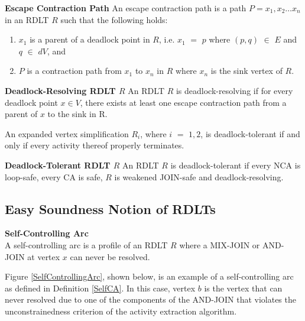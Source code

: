 \begin{defn}\textbf{Escape Contraction Path}
    \cite{Ramirez2024}
    \label{ECPath}
    An escape contraction path is a path $ P = x_1, x_2 \ldots x_n $ in an RDLT $ R $ such that the following holds:
    \begin{enumerate}
        \item $ x_1 $ is a parent of a deadlock point in $ R $, i.e. $ x_1 $ $ = $ $ p $ where $ (p,q) $ $ \in $ $ E $ and $ q $ $ \in $ $ dV $, and
        \item $ P $ is a contraction path from $ x_1 $ to $ x_n $ in $ R $ where $ x_n $ is the sink vertex of $ R $.
    \end{enumerate}
\end{defn}

\begin{defn}\textbf{Deadlock-Resolving RDLT $ R $}
    \label{DLResolving}
    \cite{Ramirez2024}
    An RDLT $ R $ is deadlock-resolving if for every deadlock point $ x \in V $, there exists at least one escape contraction path from a parent of $ x $ to the sink in R.
\end{defn}

\begin{lem}
    \cite{Ramirez2024}
    An expanded vertex simplification $ R_i $, where $ i $ $ = $ $ 1, 2 $, is deadlock-tolerant if and only if every activity thereof properly terminates.
\end{lem}

\begin{defn}\textbf{Deadlock-Tolerant RDLT $ R $}
    \cite{Ramirez2024}
    An RDLT $ R $ is deadlock-tolerant if every NCA is loop-safe, every CA is safe, $ R $ is weakened JOIN-safe and deadlock-resolving.
\end{defn}

\subsection*{Easy Soundness Notion of RDLTs}

\begin{defn}\textbf{Self-Controlling Arc} \\
    \cite{Ramirez2024}
    \label{SelfCA}
    A self-controlling arc is a profile of an RDLT $ R $ where a MIX-JOIN or AND-JOIN at vertex $ x $ can never be resolved. 
\end{defn}

Figure \ref{SelfControllingArc}, shown below, is an example of a self-controlling arc as defined in Definition \ref{SelfCA}. In this case, vertex $ b $ is the vertex that can never resolved due to one of the components of the AND-JOIN that violates the unconstrainedness criterion of the activity extraction algorithm.

